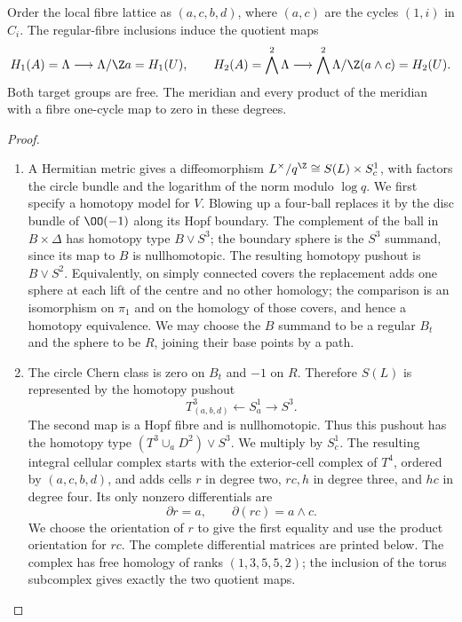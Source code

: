 \begin{proposition}[P4.3]\hypertarget{tag-02X2}{}\label{night:P4.3}\label{stmt:P4.3}

Order the local fibre lattice as $(a,c,b,d)$, where $(a,c)$ are the cycles
$(1,i)$ in $C_i$. The regular-fibre inclusions induce the quotient maps
\[
 H_1(A)=\Lambda\longrightarrow\Lambda/\Z a=H_1(U),\qquad
 H_2(A)=\bigwedge^2\Lambda\longrightarrow
 \bigwedge^2\Lambda/\Z(a\wedge c)=H_2(U).
\]
Both target groups are free. The meridian and every product of the
meridian with a fibre one-cycle map to zero in these degrees.
\end{proposition}
\begin{proof}

\begin{enumerate}[label={$\langle1\rangle$\arabic*.},leftmargin=*]
\item A Hermitian metric gives a diffeomorphism
$L^\times/q^\Z\cong S(L)\times S^1_c$, with factors the circle bundle and
the logarithm of the norm modulo $\log q$. We first specify a homotopy
model for $V$. Blowing up a four-ball replaces it by the disc bundle of
$\OO(-1)$ along its Hopf boundary. The complement of the ball in
$B\times\Delta$ has homotopy type $B\vee S^3$; the boundary sphere is
the $S^3$ summand, since its map to $B$ is nullhomotopic. The resulting
homotopy pushout is $B\vee S^2$. Equivalently, on simply connected
covers the replacement adds one sphere at each lift of the centre and
no other homology; the comparison is an isomorphism on $\pi_1$ and on
the homology of those covers, and hence a homotopy equivalence. We may
choose the $B$ summand to be a regular $B_t$ and the sphere to be $R$,
joining their base points by a path.

\item The circle Chern class is zero on $B_t$ and $-1$ on $R$. Therefore
$S(L)$ is represented by the homotopy pushout
\[
 T^3_{(a,b,d)}\longleftarrow S^1_a\longrightarrow S^3.
\]
The second map is a Hopf fibre and is nullhomotopic. Thus this pushout
has the homotopy type $(T^3\cup_aD^2)\vee S^3$. We multiply by $S^1_c$.
The resulting integral cellular complex starts with the exterior-cell
complex of $T^4$, ordered by $(a,c,b,d)$, and adds cells $r$ in degree
two, $rc,h$ in degree three, and $hc$ in degree four. Its only nonzero
differentials are
\[
 \partial r=a,\qquad \partial(rc)=a\wedge c.
\]
We choose the orientation of $r$ to give the first equality and use the
product orientation for $rc$. The complete differential matrices are
printed below. The complex has free homology of ranks $(1,3,5,5,2)$;
the inclusion of the torus subcomplex gives exactly the two quotient maps.


\end{enumerate}
\end{proof}
